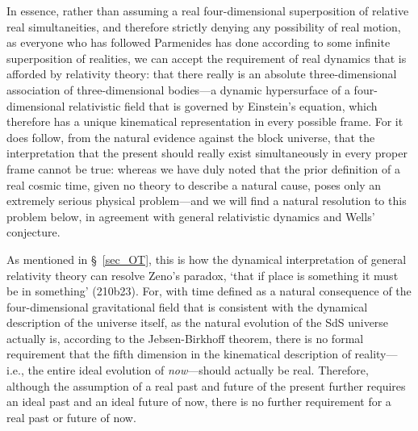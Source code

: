In essence, rather than assuming a real four-dimensional superposition of relative real simultaneities, and therefore strictly denying any possibility of real motion, as everyone who has followed Parmenides has done according to some infinite superposition of realities, we can accept the requirement of real dynamics that is afforded by relativity theory: that there really is an absolute three-dimensional association of three-dimensional bodies---a dynamic hypersurface of a four-dimensional relativistic field that is governed by Einstein's equation, which therefore has a unique kinematical representation in every possible frame. For it does follow, from the natural evidence against the block universe, that the interpretation that the present should really exist simultaneously in every proper frame cannot be true: whereas we have duly noted that the prior definition of a real cosmic time, given no theory to describe a natural cause, poses only an extremely serious physical problem---and we will find a natural resolution to this problem below, in agreement with general relativistic dynamics and Wells' conjecture.

As mentioned in \S~\ref{sec_OT}, this is how the dynamical interpretation of general relativity theory can resolve Zeno's paradox, `that if place is something it must be in something' \cite{Aristotle1984} (210b23). For, with time defined as a natural consequence of the four-dimensional gravitational field that is consistent with the dynamical description of the universe itself, as the natural evolution of the SdS universe actually is, according to the Jebsen-Birkhoff theorem, there is no formal requirement that the fifth dimension in the kinematical description of reality---i.e., the entire ideal evolution of \textit{now}---should actually be real. Therefore, although the assumption of a real past and future of the present further requires an ideal past and an ideal future of now, there is no further requirement for a real past or future of now.

